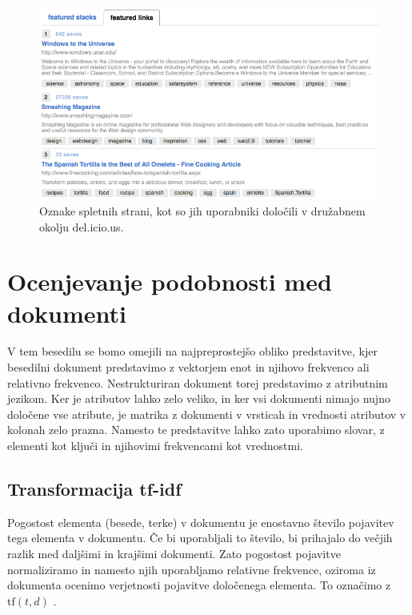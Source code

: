 \begin{figure}[htbp]
\begin{center}
\includegraphics[width=15cm]{slike/delicious.png}
\caption{Oznake spletnih strani, kot so jih uporabniki določili v
  družabnem okolju del.icio.us.}
\label{f-delicious}
\end{center}
\end{figure}


\section{Ocenjevanje podobnosti med dokumenti}

V tem besedilu se bomo omejili na najpreprostejšo obliko predstavitve,
kjer besedilni dokument predstavimo z vektorjem enot in njihovo
frekvenco ali relativno frekvenco. Nestrukturiran dokument torej
predstavimo z atributnim jezikom. Ker je atributov lahko zelo veliko,
in ker vsi dokumenti nimajo nujno določene vse atribute, je matrika z
dokumenti v vrsticah in vrednosti atributov v kolonah zelo
prazna. Namesto te predstavitve lahko zato uporabimo slovar, z
elementi kot ključi in njihovimi frekvencami kot vrednostmi.

\subsection{Transformacija tf-idf}

Pogostost elementa (besede, terke) v dokumentu je enostavno število
pojavitev tega elementa v dokumentu. Če bi uporabljali to število, bi
prihajalo do večjih razlik med daljšimi in krajšimi dokumenti. Zato
pogostost pojavitve normaliziramo in namesto njih uporabljamo
relativne frekvence, oziroma iz dokumenta ocenimo verjetnosti
pojavitve določenega elementa. To označimo z $\mathrm{tf}(t,d)$
.

